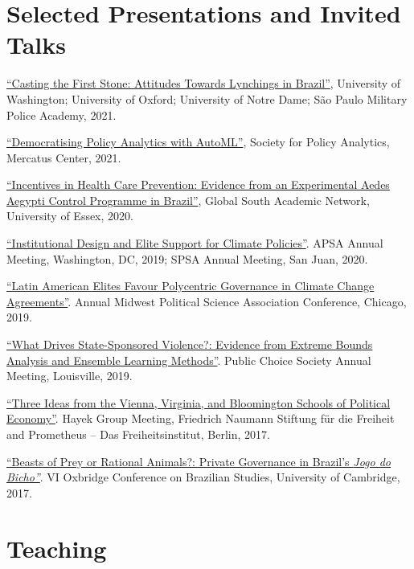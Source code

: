 \documentclass[a4paper]{article}
\renewenvironment{itemize}{
	\begin{list}{}{
			\setlength{\leftmargin}{1.5em}
		}
		}{
	\end{list}
}
\begin{document}
\section*{Selected Presentations and Invited Talks}

\begin{itemize}
\item \href{https://github.com/danilofreire/lynching-experiment-brazil}{``Casting the First Stone: Attitudes Towards Lynchings in Brazil''}, University of Washington; University of Oxford; University of Notre Dame; São Paulo Military Police Academy, 2021.
\item \href{http://github.com/danilofreire/mercatus-analytics-papers}{``Democratising Policy Analytics with AutoML''}, Society for Policy Analytics, Mercatus Center, 2021.
\item \href{https://danilofreire.github.io/essex2020/aedes.html}{``Incentives in Health Care Prevention: Evidence from an Experimental Aedes Aegypti Control Programme in Brazil''}, Global South Academic Network, University of Essex, 2020.
\item \href{https://osf.io/9a6ch}{``Institutional Design and Elite Support for Climate Policies''}. APSA Annual Meeting, Washington, DC, 2019; SPSA Annual Meeting, San Juan, 2020.
\item \href{https://osf.io/9a6ch}{``Latin American Elites Favour Polycentric Governance in Climate Change Agreements''}. Annual Midwest Political Science Association Conference, Chicago, 2019.
\item \href{http://danilofreire.github.io/pcs-2019}{``What Drives State-Sponsored Violence?: Evidence from Extreme Bounds Analysis and Ensemble Learning Methods''}. Public Choice Society Annual Meeting, Louisville, 2019.
\item \href{https://www.overleaf.com/project/591ef5259fb58ede3dc4d369}{``Three Ideas from the Vienna, Virginia, and Bloomington Schools of Political Economy''}. Hayek Group Meeting, Friedrich Naumann Stiftung f{\"u}r die Freiheit and Prometheus -- Das Freiheitsinstitut, Berlin, 2017.
\item \href{https://osf.io/se2jr}{``Beasts of Prey or Rational Animals?: Private Governance in Brazil's \emph{Jogo do Bicho''}}. VI Oxbridge Conference on Brazilian Studies, University of Cambridge, 2017.
\end{itemize}

\section*{Teaching}
\end{document}
